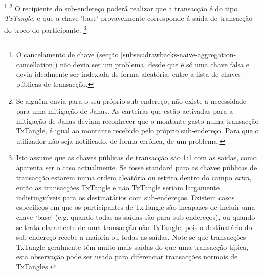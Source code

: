 \footnote{O cancelamento de chave (secção \ref{subsec:drawbacks-naive-aggregation-cancellation}) não devia ser um problema, desde que é só uma chave falsa e devia idealmente ser indexada de forma aleatória, entre a lista de chaves públicas de transacção.}
\footnote{Se alguêm envia para o seu próprio sub-endereço, não existe a necessidade para uma mitigação de Janus. As carteiras que estão activadas para a mitigação de Janus deviam reconhecer que o montante gasto numa transacção TxTangle, é igual ao montante recebido pelo próprio sub-endereço. Para que o utilizador não seja notificado, de forma errónea, de um problema.}
O recipiente do sub-endereço poderá realizar que a transacção é do tipo {\em TxTangle}, e que a chave `base' provavelmente corresponde á saída de transacção do troco do participante.     
\footnote{Isto assume que as chaves públicas de transacção são 1:1 com as saídas, como aparenta ser o caso actualmente. Se fosse standard para as chaves públicas de transacção estarem numa ordem aleatória ou estrita dentro do campo {\em extra}, então as transacções TxTangle e não TxTangle seriam largamente indistinguíveis para os destinatários com sub-endereços. Existem casos específicos em que os participantes de TxTangle são incapazes de incluir uma chave `base' (e.g. quando todas as saídas são para sub-endereços), ou quando se trata claramente de uma transacção não TxTangle, pois o destinatário do sub-endereço recebe a maioria ou todas as saídas. Note-se que transacções TxTangle geralmente têm muito mais saídas do que uma transacção típica, esta observação pode ser usada para diferenciar transacções normais de TxTangles.}
